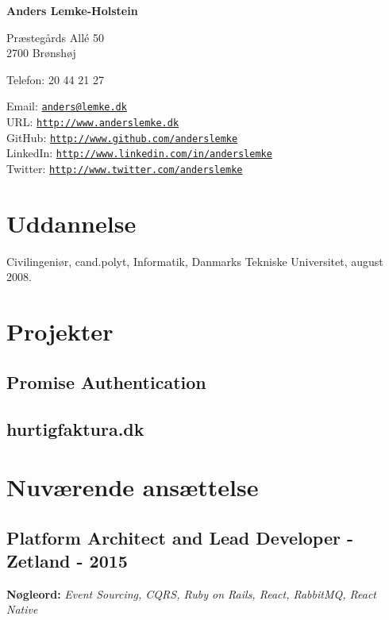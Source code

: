 \documentclass[a4paper]{article}
\newcommand{\keywords}[1]{\small\textbf{Nøgleord:} \emph{#1}\normalsize}
\begin{document}
{\huge\bf Anders Lemke-Holstein}

\bigskip
Præstegårds Allé 50 \\
2700 Brønshøj

\medskip

Telefon: 20 44 21 27

\medskip

Email: \href{mailto:anders@lemke.dk}{\tt anders@lemke.dk} \\
URL: \href{http://www.anderslemke.dk}{\tt http://www.anderslemke.dk} \\
GitHub: \href{http://www.github.com/anderslemke}{\tt http://www.github.com/anderslemke} \\
LinkedIn: \href{http://www.linkedin.com/in/anderslemke}{\tt http://www.linkedin.com/in/anderslemke} \\
Twitter: \href{http://www.twitter.com/anderslemke}{\tt http://www.twitter.com/anderslemke} 

\section*{Uddannelse}

Civilingeniør, cand.polyt, Informatik, Danmarks Tekniske Universitet, august 2008.

\section*{Projekter}

\subsection*{Promise Authentication}

\subsection*{hurtigfaktura.dk}

\section*{Nuværende ansættelse}

\subsection*{Platform Architect and Lead Developer - Zetland - 2015}
\keywords{Event Sourcing, CQRS, Ruby on Rails, React, RabbitMQ, React Native}
\end{document}
